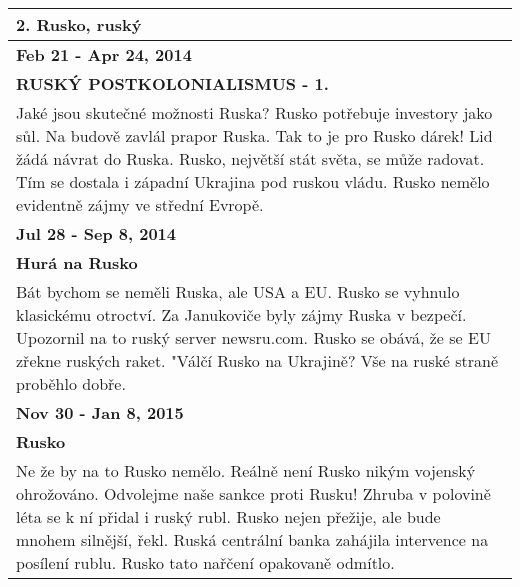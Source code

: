\begin{tabularx}{\linewidth}{p{\linewidth}} \toprule[1.5pt]
\bf 2. Rusko, ruský \\ \midrule
\bf Feb 21 - Apr 24, 2014 \\ \midrule
\bf RUSKÝ POSTKOLONIALISMUS - 1. \\
Jaké jsou skutečné možnosti Ruska? Rusko potřebuje investory jako sůl. Na budově zavlál prapor Ruska. Tak to je pro Rusko dárek! Lid žádá návrat do Ruska. Rusko, největší stát světa, se může radovat. Tím se dostala i západní Ukrajina pod ruskou vládu. Rusko nemělo evidentně zájmy ve střední Evropě. \\ \bottomrule[1.25pt]

\bf Jul 28 - Sep 8, 2014 \\ \midrule
\bf Hurá na Rusko \\
Bát bychom se neměli Ruska, ale USA a EU. Rusko se vyhnulo klasickému otroctví. Za Janukoviče byly zájmy Ruska v bezpečí. Upozornil na to ruský server newsru.com. Rusko se obává, že se EU zřekne ruských raket. "Válčí Rusko na Ukrajině? Vše na ruské straně proběhlo dobře. \\ \bottomrule[1.25pt]

\bf Nov 30 - Jan 8, 2015 \\ \midrule
\bf Rusko \\
Ne že by na to Rusko nemělo. Reálně není Rusko nikým vojenský ohrožováno. Odvolejme naše sankce proti Rusku! Zhruba v polovině léta se k ní přidal i ruský rubl. Rusko nejen přežije, ale bude mnohem silnější, řekl. Ruská centrální banka zahájila intervence na posílení rublu. Rusko tato nařčení opakovaně odmítlo. \\ \bottomrule[1.25pt]
\end{tabularx}


\hspace{\fill}